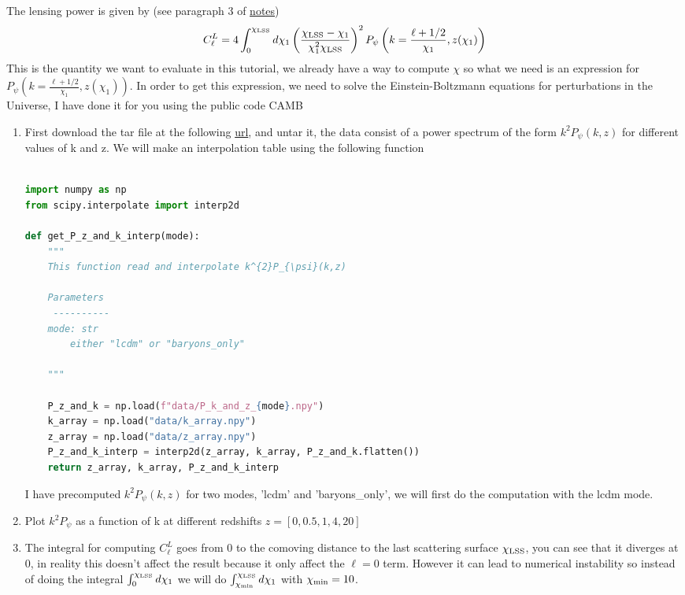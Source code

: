 \documentclass[a4paper, 11pt]{article}
\def\ba{\begin{eqnarray}}
\def\ea{\end{eqnarray}}
\begin{document}
The lensing power is given by   (see paragraph 3 of \href{https://github.com/thibautlouis/thibautlouis.github.io/blob/master/derivation.pdf}{notes})
\ba
C^{L}_{\ell} =  4  \int^{\chi_{\rm LSS}}_{0}  d\chi_{1}  \left(\frac{\chi_{\rm LSS} - \chi_{1}}{\chi^{2}_{1}\chi_{\rm LSS} } \right)^{2}  P_{\psi} \left(k = \frac{\ell + 1/2}{\chi_{1}}, z(\chi_{1}) \right) 
\ea
This is the quantity we want to evaluate in this tutorial, we already have a way to compute $\chi$ so what we need is an expression for $P_{\psi} \left(k = \frac{\ell + 1/2}{\chi_{1}}, z(\chi_{1}) \right) $.
In order to get this expression, we need to solve the Einstein-Boltzmann equations for perturbations in the Universe, I have done it for you using the public code CAMB




\begin{enumerate}
\item First download the tar file at the following \href{https://github.com/thibautlouis/TD_ED_Phoeenix/blob/main/data.tar.gz}{url}, and untar it, the data consist of a power spectrum of the form $k^{2}P_{\psi}(k,z)$ for different values of k and z.
We will make an interpolation table using the following function  \\ \\
 \begin{lstlisting}[language=Python]
import numpy as np
from scipy.interpolate import interp2d

def get_P_z_and_k_interp(mode):
    """
    This function read and interpolate k^{2}P_{\psi}(k,z)
    
    Parameters
     ----------
    mode: str
        either "lcdm" or "baryons_only"

    """

    P_z_and_k = np.load(f"data/P_k_and_z_{mode}.npy")
    k_array = np.load("data/k_array.npy")
    z_array = np.load("data/z_array.npy")
    P_z_and_k_interp = interp2d(z_array, k_array, P_z_and_k.flatten())
    return z_array, k_array, P_z_and_k_interp

\end{lstlisting}
I have precomputed $k^{2}P_{\psi}(k,z)$   for two modes, 'lcdm' and 'baryons\_only', we will first do the computation with the lcdm mode.
\item Plot $k^{2}P_{\psi}$  as a function of k at different redshifts $z = [0, 0.5, 1, 4 ,20]$
\item   The integral for computing $C^{L}_{\ell} $ goes from 0 to the comoving distance to the last scattering surface $\chi_{\rm LSS}$, you can see that it diverges at 0, in reality this doesn't affect the result because it only affect the $\ell =0$ term. However it can lead to numerical instability so instead of doing the integral  $\int^{\chi_{\rm LSS}}_{0}  d\chi_{1}$ we will do $\int^{\chi_{\rm LSS}}_{\chi_{\rm min}}  d\chi_{1}$ with $\chi_{\rm min}=10$.


\end{enumerate}
\end{document}
